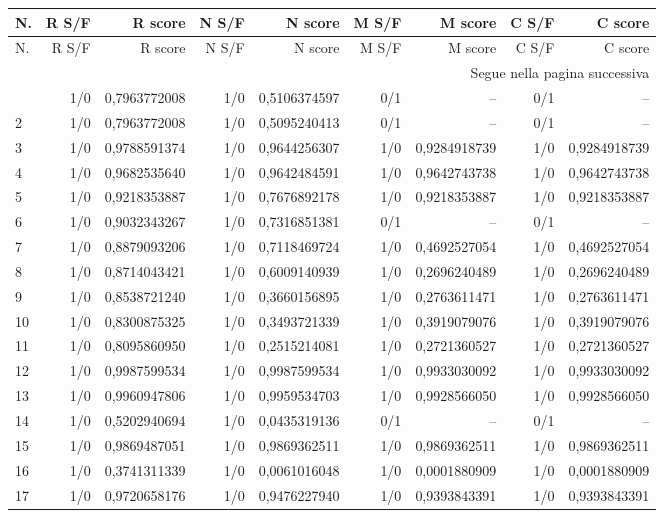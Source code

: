 \begin{longtable}{lrrrrrrrr}
\toprule
N. & R S/F & R score & N S/F & N score & M S/F & M score & C S/F & C score \\
\midrule
\endfirsthead
\toprule
N. & R S/F & R score & N S/F & N score & M S/F & M score & C S/F & C score \\
\midrule\endhead
\midrule\multicolumn{9}{r}{\footnotesize Segue nella pagina successiva}\\
\endfoot
\bottomrule\endlastfoot
1 & 1/0 & 0,7963772008 & 1/0 & 0,5106374597 & 0/1 & -- & 0/1 & -- \\
2 & 1/0 & 0,7963772008 & 1/0 & 0,5095240413 & 0/1 & -- & 0/1 & -- \\
3 & 1/0 & 0,9788591374 & 1/0 & 0,9644256307 & 1/0 & 0,9284918739 & 1/0 & 0,9284918739 \\
4 & 1/0 & 0,9682535640 & 1/0 & 0,9642484591 & 1/0 & 0,9642743738 & 1/0 & 0,9642743738 \\
5 & 1/0 & 0,9218353887 & 1/0 & 0,7676892178 & 1/0 & 0,9218353887 & 1/0 & 0,9218353887 \\
6 & 1/0 & 0,9032343267 & 1/0 & 0,7316851381 & 0/1 & -- & 0/1 & -- \\
7 & 1/0 & 0,8879093206 & 1/0 & 0,7118469724 & 1/0 & 0,4692527054 & 1/0 & 0,4692527054 \\
8 & 1/0 & 0,8714043421 & 1/0 & 0,6009140939 & 1/0 & 0,2696240489 & 1/0 & 0,2696240489 \\
9 & 1/0 & 0,8538721240 & 1/0 & 0,3660156895 & 1/0 & 0,2763611471 & 1/0 & 0,2763611471 \\
10 & 1/0 & 0,8300875325 & 1/0 & 0,3493721339 & 1/0 & 0,3919079076 & 1/0 & 0,3919079076 \\
11 & 1/0 & 0,8095860950 & 1/0 & 0,2515214081 & 1/0 & 0,2721360527 & 1/0 & 0,2721360527 \\
12 & 1/0 & 0,9987599534 & 1/0 & 0,9987599534 & 1/0 & 0,9933030092 & 1/0 & 0,9933030092 \\
13 & 1/0 & 0,9960947806 & 1/0 & 0,9959534703 & 1/0 & 0,9928566050 & 1/0 & 0,9928566050 \\
14 & 1/0 & 0,5202940694 & 1/0 & 0,0435319136 & 0/1 & -- & 0/1 & -- \\
15 & 1/0 & 0,9869487051 & 1/0 & 0,9869362511 & 1/0 & 0,9869362511 & 1/0 & 0,9869362511 \\
16 & 1/0 & 0,3741311339 & 1/0 & 0,0061016048 & 1/0 & 0,0001880909 & 1/0 & 0,0001880909 \\
17 & 1/0 & 0,9720658176 & 1/0 & 0,9476227940 & 1/0 & 0,9393843391 & 1/0 & 0,9393843391 \\

\end{longtable}
